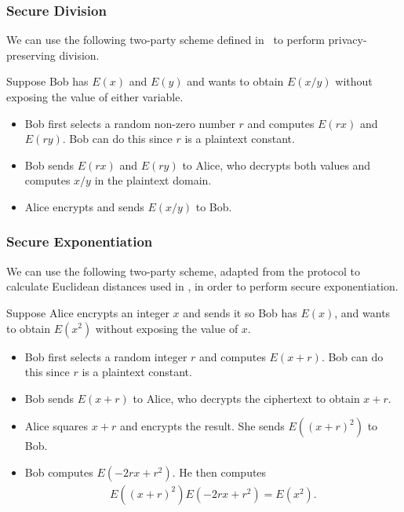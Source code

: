 \subsubsection{Secure Division}
We can use the following two-party scheme defined in~\cite{boukoros_lightweight_2017} to perform privacy-preserving division.

Suppose Bob has $E(x)$ and $E(y)$ and wants to obtain $E(x/y)$ without exposing the value of either variable.
\begin{itemize}
	\item Bob first selects a random non-zero number $r$ and computes $E(rx)$ and $E(ry)$. Bob can do this since $r$ is a plaintext constant.
	\item Bob sends $E(rx)$ and $E(ry)$ to Alice, who decrypts both values and computes $x/y$ in the plaintext domain.
	\item Alice encrypts and sends $E(x/y)$ to Bob.
\end{itemize}

\subsubsection{Secure Exponentiation}
\label{ssec:exponentiationprotocol}
 We can use the following two-party scheme, adapted from the protocol to calculate Euclidean distances used in \cite{hutchison_privacy-preserving_2009}, in order to perform secure exponentiation.

Suppose Alice encrypts an integer $x$ and sends it so Bob has $E(x)$, and wants to obtain $E(x^2)$ without exposing the value of $x$.
\begin{itemize}
	\item Bob first selects a random integer $r$ and computes $E(x+r)$. Bob can do this since $r$ is a plaintext constant.
	\item Bob sends $E(x+r)$ to Alice, who decrypts the ciphertext to obtain $x+r$.
	\item Alice squares $x+r$ and encrypts the result. She sends $E((x+r)^2)$ to Bob.
	\item Bob computes $E(-2rx + r^2)$. He then computes
	\begin{align*}
		E((x+r)^2)E(-2rx + r^2) = E(x^2).
	\end{align*}
\end{itemize}

